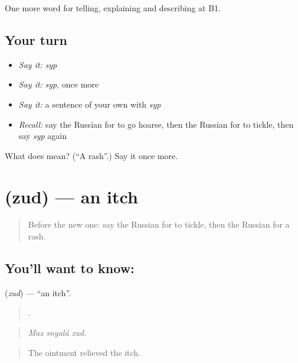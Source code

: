 \begin{grammarlens}[title={What you've built}]
One more word for telling, explaining and describing at B1.
\end{grammarlens}

\subsection*{Your turn}
\begin{itemize}
\raggedright
  \item \emph{Say it:} \emph{syp}
  \item \emph{Say it:} \emph{syp}, once more
  \item \emph{Say it:} a sentence of your own with \emph{syp}
  \item \emph{Recall:} say the Russian for to go hoarse, then the Russian for to tickle, then say \emph{syp} again
\end{itemize}

\begin{tcolorbox}[breakable,colback=teal!4,colframe=teal!35!black,title={Before you move on}]
What does  mean? (\textquotedblleft{}A rash\textquotedblright{}.) Say it once more.
\end{tcolorbox}
\section[\texorpdfstring{\ru{зуд} (zud)}{зуд (zud)}]{ (zud) — an itch}

\label{lesson:RU-C487-zud}



\begin{quote}
Before the new one: say the Russian for to tickle, then the Russian for a rash.
\end{quote}

\subsection*{You'll want to know: }
\textbf{} (\emph{zud}) — \textquotedblleft{}an itch\textquotedblright{}.

\begin{quote}
  .
\end{quote}

\begin{quote}
\emph{Maz snyalá zud.}
\end{quote}

\begin{quote}
The ointment relieved the itch.
\end{quote}

